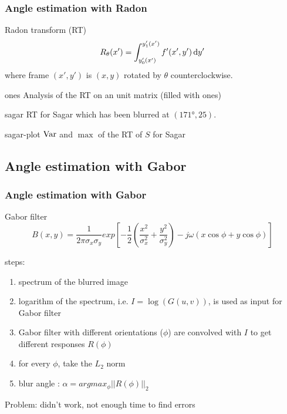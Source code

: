 \begin{frame}[allowframebreaks]
  \frametitle{Angle estimation with Radon}
  \begin{block}{Radon transform (RT)}
    \[ R_\theta(x') = \int_{y_0'(x')}^{y_1'(x')} f'(x',y') \operatorname{d}\! y' \]
    where frame $(x',y')$ is $(x,y)$ rotated by $\theta$ counterclockwise.
  \end{block}

  \begin{myfig}{ones}
    {Analysis of the RT on an unit matrix (filled with ones)}
  \end{myfig}

  \begin{myfig}{sagar}
    {RT for Sagar which has been blurred at $(\ang{171}, 25)$.}
  \end{myfig}

  \begin{myfig}{sagar-plot}
    {$\operatorname{Var}$ and $\max$ of the RT of $S$ for Sagar}
  \end{myfig}
\end{frame}

\subsection{Angle estimation with Gabor}
\begin{frame}
	\frametitle{Angle estimation with Gabor}
	\begin{block}{Gabor filter}
    \[ B(x,y)=\dfrac{1}{2\pi \sigma_x \sigma_y} exp\left[-\frac{1}{2}\left(\frac{x^2}{\sigma_x^2}+ \frac{y^2}{\sigma_y^2} \right) -j\omega(x\cos\phi + y\cos\phi)\right] \]
	\end{block}
	steps:
	\begin{enumerate}
	\item spectrum of the blurred image
	\item logarithm of the spectrum, i.e. $I=\log(G(u,v))$, is used as input for Gabor filter
	\item Gabor filter with different orientations ($\phi$) are convolved with $I$ to get different responses $R(\phi)$
	\item for every $\phi$, take the $L_2$ norm
	\item blur angle : $\alpha = arg{max_{\phi}||R(\phi)||_2}$
	\end{enumerate}
	
	Problem: didn't work, not enough time to find errors
\end{frame}


